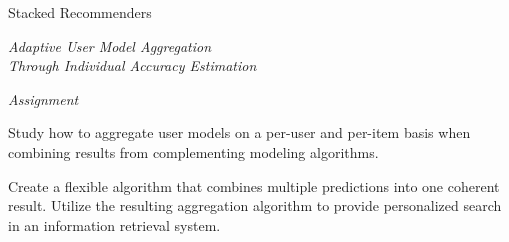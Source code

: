 \begin{narrow}

\null\vspace{6em}

{
  \centering
  \LARGE{Stacked Recommenders}\\
  \vspace{1em}
  
  \itshape
  \color{red}
  \large{Adaptive User Model Aggregation}\\
  \large{Through Individual Accuracy Estimation}\\
}

\vspace{5em}

{
  \centering
  \itshape
  Assignment\\
}
\vspace{1em}

Study how to aggregate user models on a per-user and per-item
basis when combining results from complementing modeling algorithms.

Create a flexible algorithm that combines multiple predictions
into one coherent result.
Utilize the resulting aggregation algorithm
to provide personalized search in an information retrieval system.

\end{narrow}
\vfill
\clearpage

